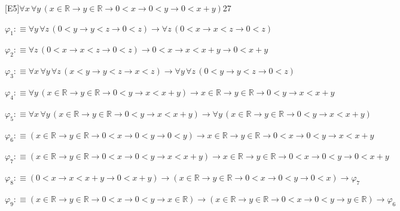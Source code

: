 \begin{fullproof}{[E5]}{$\forall x\,\forall y\,(x \in \mathbb{R} \to y \in \mathbb{R} \to 0 < x \to 0 < y \to 0 < x + y)$}{27}
\begin{ptree}
\end{ptree}
\begin{abbrevlist}
\item $\varphi_{1} :\equiv \forall y\,\forall z\,(0 < y \to y < z \to 0 < z) \to \forall z\,(0 < x \to x < z \to 0 < z)$
\item $\varphi_{2} :\equiv \forall z\,(0 < x \to x < z \to 0 < z) \to 0 < x \to x < x + y \to 0 < x + y$
\item $\varphi_{3} :\equiv \forall x\,\forall y\,\forall z\,(x < y \to y < z \to x < z) \to \forall y\,\forall z\,(0 < y \to y < z \to 0 < z)$
\item $\varphi_{4} :\equiv \forall y\,(x \in \mathbb{R} \to y \in \mathbb{R} \to 0 < y \to x < x + y) \to x \in \mathbb{R} \to y \in \mathbb{R} \to 0 < y \to x < x + y$
\item $\varphi_{5} :\equiv \forall x\,\forall y\,(x \in \mathbb{R} \to y \in \mathbb{R} \to 0 < y \to x < x + y) \to \forall y\,(x \in \mathbb{R} \to y \in \mathbb{R} \to 0 < y \to x < x + y)$
\item $\varphi_{6} :\equiv (x \in \mathbb{R} \to y \in \mathbb{R} \to 0 < x \to 0 < y \to 0 < y) \to x \in \mathbb{R} \to y \in \mathbb{R} \to 0 < x \to 0 < y \to x < x + y$
\item $\varphi_{7} :\equiv (x \in \mathbb{R} \to y \in \mathbb{R} \to 0 < x \to 0 < y \to x < x + y) \to x \in \mathbb{R} \to y \in \mathbb{R} \to 0 < x \to 0 < y \to 0 < x + y$
\item $\varphi_{8} :\equiv (0 < x \to x < x + y \to 0 < x + y) \to (x \in \mathbb{R} \to y \in \mathbb{R} \to 0 < x \to 0 < y \to 0 < x) \to \varphi_{7}$
\item $\varphi_{9} :\equiv (x \in \mathbb{R} \to y \in \mathbb{R} \to 0 < x \to 0 < y \to x \in \mathbb{R}) \to (x \in \mathbb{R} \to y \in \mathbb{R} \to 0 < x \to 0 < y \to y \in \mathbb{R}) \to \varphi_{6}$
\end{abbrevlist}
\end{fullproof}
